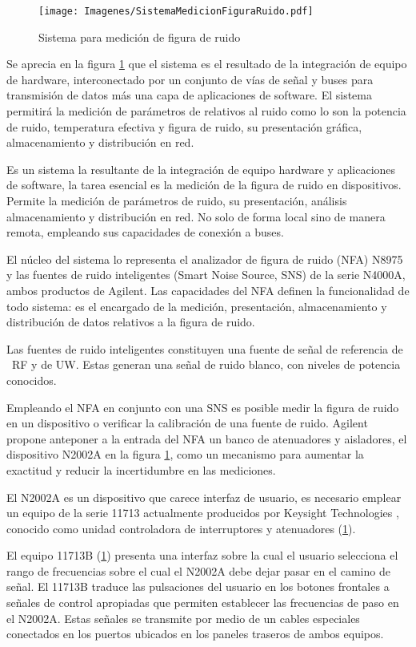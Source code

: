 	\begin{figure}[h!]
		\centering
		\texttt{[image: Imagenes/SistemaMedicionFiguraRuido.pdf]}
		\caption{Sistema para medición de figura de ruido}
		\label{Fig:EsquemaSistemaMedicion}
	\end{figure}
	
	Se aprecia en la figura \ref{Fig:EsquemaSistemaMedicion} que el sistema es el resultado de la integración de equipo de hardware, interconectado por un conjunto de vías de señal y buses para transmisión de datos más una capa de aplicaciones de software. El sistema permitirá la medición de parámetros de relativos al ruido como lo son la potencia de ruido, temperatura efectiva y figura de ruido, su presentación gráfica, almacenamiento y distribución en red.
	
	Es un sistema la resultante de la integración de equipo hardware y aplicaciones de software, la tarea esencial es la	medición de la figura de ruido en dispositivos.  Permite la medición de parámetros de ruido, su presentación, análisis almacenamiento y distribución en red. No solo de forma local sino de manera remota, empleando sus capacidades de	conexión a buses.
	
	El núcleo del sistema lo representa el analizador de figura de ruido (NFA) N8975 y las fuentes de ruido inteligentes (Smart Noise Source, SNS) de la serie N4000A, ambos productos de Agilent. Las capacidades del NFA definen la funcionalidad de todo sistema: es el encargado de la medición, presentación, almacenamiento y distribución de datos relativos a la figura de ruido. 
	
	Las fuentes de ruido inteligentes constituyen una fuente de señal de referencia de \ RF y de UW. Estas generan una señal de ruido blanco, con niveles de potencia conocidos. 
	
	Empleando el NFA en conjunto con una SNS es posible medir la figura de ruido en un dispositivo o verificar la calibración de una fuente de ruido. Agilent propone anteponer a la entrada del NFA un banco de atenuadores y aisladores, el dispositivo N2002A en la figura \ref{Fig:EsquemaSistemaMedicion}, como un mecanismo para aumentar la exactitud y reducir la incertidumbre en las mediciones.
	
	El N2002A es un dispositivo que carece interfaz de usuario, es necesario emplear un equipo de la serie 11713 \textemdash actualmente producidos por Keysight Technologies \textemdash, conocido como unidad controladora de interruptores y atenuadores (\ref{Fig:EsquemaSistemaMedicion}). 
	
	El equipo 11713B (\ref{Fig:EsquemaSistemaMedicion}) presenta una interfaz sobre la cual el usuario selecciona el rango de frecuencias sobre el	cual el N2002A debe dejar pasar en el camino de señal. El 11713B traduce las pulsaciones del usuario en los botones frontales a señales de control apropiadas que permiten establecer las frecuencias de paso en el N2002A. Estas señales	se transmite por medio de un cables especiales conectados en los puertos ubicados en los paneles traseros de ambos equipos.
	


